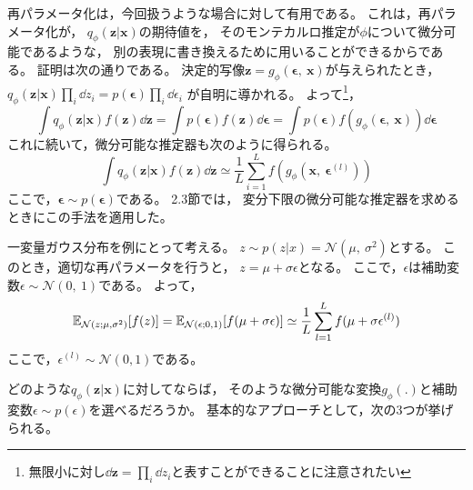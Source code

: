 \documentclass[dvipdfmx, fleqn]{jsarticle}
\begin{document}
再パラメータ化は，今回扱うような場合に対して有用である。
これは，再パラメータ化が，
\(q_{\phi} (\bm{z} | \bm{x})\)の期待値を，
そのモンテカルロ推定が\(\phi\)について微分可能であるような，
別の表現に書き換えるために用いることができるからである。
証明は次の通りである。
決定的写像\(\bm{z} = g_{\phi} (\bm{\epsilon},\ \bm{x})\)が与えられたとき，
\(q_{\phi} (\bm{z} | \bm{x}) \prod_{i} \dd{z_i} = p(\bm{\epsilon}) \prod_{i} \dd{\epsilon_i}\)
が自明に導かれる。
よって\footnote{無限小に対し\(\dd{\bm{z}} = \prod_{i} \dd{z_i}\)と表すことができることに注意されたい}，
\begin{equation*}
    \int q_{\phi} (\bm{z} | \bm{x}) f(\bm{z}) \dd{\bm{z}}
        = \int p(\bm{\epsilon}) f(\bm{z}) \dd{\bm{\epsilon}}
        = \int p(\bm{\epsilon}) f(g_{\phi} (\bm{\epsilon},\ \bm{x})) \dd{\bm{\epsilon}}
\end{equation*}
これに続いて，微分可能な推定器も次のように得られる。
\begin{equation*}
    \int q_{\phi} (\bm{z} | \bm{x}) f(\bm{z}) \dd{\bm{z}}
        \simeq \frac{1}{L} \sum_{i=1}^{L} f(g_{\phi} (\bm{x},\ \bm{\epsilon}^{(l)}))
\end{equation*}
ここで，\(\bm{\epsilon} \sim p(\bm{\epsilon})\)である。
2.3節では，
変分下限の微分可能な推定器を求めるときにこの手法を適用した。

一変量ガウス分布を例にとって考える。
\(z \sim p(z|x) = \mathcal{N}(\mu,\ \sigma^2)\)とする。
このとき，適切な再パラメータを行うと，
\(z = \mu + \sigma \epsilon\)となる。
ここで，\(\epsilon\)は補助変数\(\epsilon \sim \mathcal{N} (0,\ 1)\)である。
よって，
\begin{equation*}
    \mathbb{E}_{\mathcal{N}(z; \mu, \sigma^2)} \qty[f(z)]
        = \mathbb{E}_{\mathcal{N}(\epsilon; 0, 1)} \qty[f(\mu + \sigma \epsilon)]
        \simeq \frac{1}{L} \sum_{l=1}^{L} f(\mu + \sigma \epsilon^{(l)})
\end{equation*}
ここで，\(\epsilon^{(l)} \sim \mathcal{N}(0, 1)\)である。

どのような\(q_{\phi} (\bm{z} | \bm{x})\)に対してならば，
そのような微分可能な変換\(g_{\phi} (.)\)と補助変数\(\epsilon \sim p(\epsilon)\)を選べるだろうか。
基本的なアプローチとして，次の3つが挙げられる。
\end{document}
